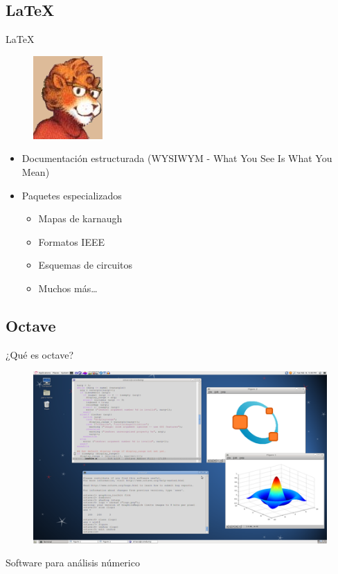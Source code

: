 \documentclass{beamer}
\begin{document}
\subsection[\LaTeX - \url{http://www.latex-project.org}]{\LaTeX}

\begin{frame}{\LaTeX}
  \begin{figure}
    \centering
    \includegraphics[scale=0.6]{img/latex}
  \end{figure}
  \begin{itemize}
  \item Documentación estructurada (WYSIWYM - What You See Is What You Mean)
  \item Paquetes especializados
    \begin{itemize}
    \item Mapas de karnaugh
    \item Formatos IEEE
    \item Esquemas de circuitos
    \item Muchos más\dots
    \end{itemize}
  \end{itemize}
\end{frame}

\subsection[Octave - \url{http://www.octave.org}]{Octave}

\begin{frame}{¿Qué es octave?}
  \begin{figure}
    \centering
    \includegraphics[scale=0.5]{img/octave}
  \end{figure}
  Software para análisis númerico
\end{frame}
\end{document}
